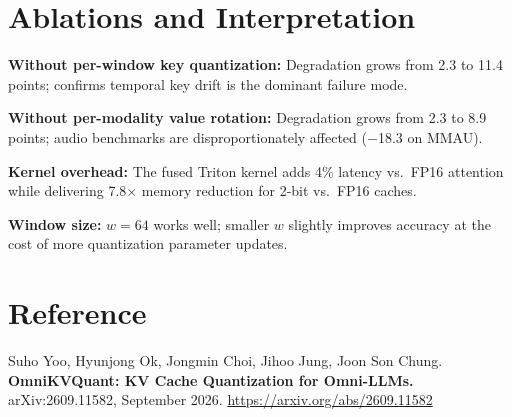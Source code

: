 \documentclass[10pt,twocolumn]{article}
\begin{document}
\section{Ablations and Interpretation}

\textbf{Without per-window key quantization:} Degradation grows from
2.3 to 11.4 points; confirms temporal key drift is the dominant
failure mode.

\textbf{Without per-modality value rotation:} Degradation grows from
2.3 to 8.9 points; audio benchmarks are disproportionately
affected ($-$18.3 on MMAU).

\textbf{Kernel overhead:} The fused Triton kernel adds 4\% latency
vs.\ FP16 attention while delivering 7.8$\times$ memory reduction
for 2-bit vs.\ FP16 caches.

\textbf{Window size:} $w = 64$ works well; smaller $w$ slightly
improves accuracy at the cost of more quantization parameter updates.

\section*{Reference}

Suho Yoo, Hyunjong Ok, Jongmin Choi, Jihoo Jung, Joon Son Chung.
\textbf{OmniKVQuant: KV Cache Quantization for Omni-LLMs.}
arXiv:2609.11582, September 2026.
\url{https://arxiv.org/abs/2609.11582}
\end{document}
